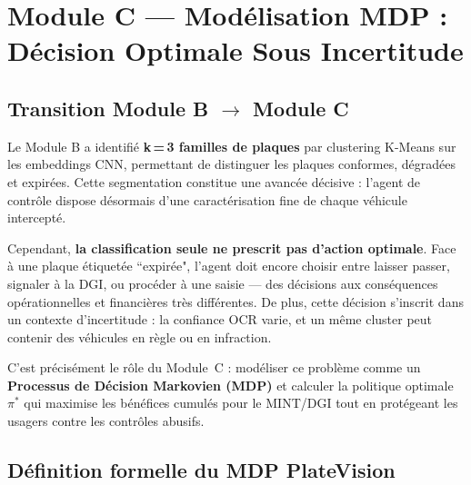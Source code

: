 
\chapter{Module C --- Mod\'{e}lisation MDP : D\'{e}cision Optimale Sous Incertitude}
\label{chap:module_c}

\section{Transition Module B $\rightarrow$ Module C}
\label{sec:c:transition_b}

Le Module B a identifi\'{e} \textbf{k\,=\,3 familles de plaques} par clustering
K-Means sur les embeddings CNN, permettant de distinguer les plaques conformes,
d\'{e}grad\'{e}es et expir\'{e}es. Cette segmentation constitue une avanc\'{e}e
d\'{e}cisive : l'agent de contr\^{o}le dispose d\'{e}sormais d'une caract\'{e}risation
fine de chaque v\'{e}hicule intercept\'{e}.

Cependant, \textbf{la classification seule ne prescrit pas d'action optimale}.
Face \`{a} une plaque \'{e}tiquet\'{e}e ``expir\'{e}e", l'agent doit encore choisir
entre laisser passer, signaler \`{a} la DGI, ou proc\'{e}der \`{a} une saisie ---
des d\'{e}cisions aux cons\'{e}quences op\'{e}rationnelles et financi\`{e}res
tr\`{e}s diff\'{e}rentes. De plus, cette d\'{e}cision s'inscrit dans un contexte
d'incertitude : la confiance OCR varie, et un m\^{e}me cluster peut contenir
des v\'{e}hicules en r\`{e}gle ou en infraction.

C'est pr\'{e}cis\'{e}ment le r\^{o}le du Module~C : mod\'{e}liser ce probl\`{e}me
comme un \textbf{Processus de D\'{e}cision Markovien (MDP)} et calculer la
politique optimale $\pi^*$ qui maximise les b\'{e}n\'{e}fices cumul\'{e}s pour
le MINT/DGI tout en prot\'{e}geant les usagers contre les contr\^{o}les abusifs.

\section{D\'{e}finition formelle du MDP PlateVision}
\label{sec:c:mdp_def}

